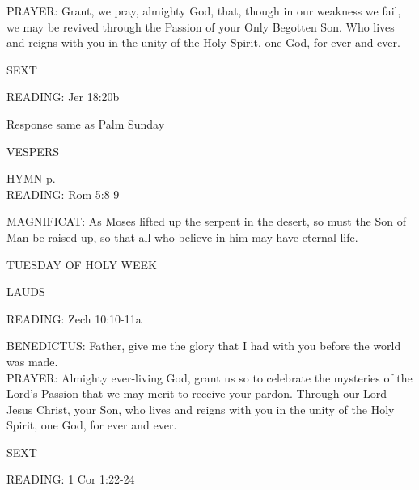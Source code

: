 \noindent\small{\uppercase{PRAYER:}}	Grant, we pray, almighty God, that, though in our weakness we fail, we may be revived through the Passion of your Only Begotten Son. Who lives and reigns with you in the unity of the Holy Spirit, one God, for ever and ever.

\begin{flushleft}\normalsize{\uppercase{SEXT\\}}\end{flushleft}
READING:    Jer 18:20b

Response same as Palm Sunday

\begin{flushleft}\normalsize{\uppercase{VESPERS\\}}\end{flushleft}
\small{\uppercase{HYMN} p. \pageref{lent:firstHymn}-\pageref{lent:lastHymn}\\}
\noindent\small{\uppercase{READING:}}    Rom 5:8-9 \textbf{   \\}

\noindent\small{\uppercase{MAGNIFICAT:}}	As Moses lifted up the serpent in the desert, so must the Son of Man be raised up, so that all who believe in him may have eternal life.\\

	\begin{center}
\normalsize TUESDAY OF HOLY WEEK
	\end{center}

\begin{flushleft}\normalsize{\uppercase{LAUDS\\}}\end{flushleft}
READING:    Zech 10:10-11a    

\noindent\small{\uppercase{BENEDICTUS:}}	Father, give me the glory that I had with you before the world was made.\\

\noindent\small{\uppercase{PRAYER:}}	Almighty ever-living God, grant us so to celebrate the mysteries of the Lord's Passion that we may merit to receive your pardon. Through our Lord Jesus Christ, your Son, who lives and reigns with you in the unity of the Holy Spirit, one God, for ever and ever.

\begin{flushleft}\normalsize{\uppercase{SEXT\\}}\end{flushleft}
\noindent\small{\uppercase{READING:}}    1 Cor 1:22-24 \textbf{   \\}

